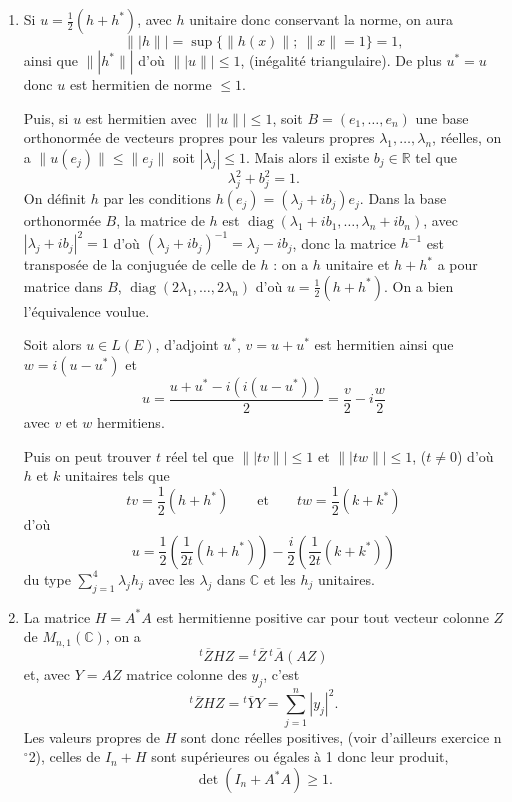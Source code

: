 \begin{enumerate}[label=\arabic*.,leftmargin=2.2em,itemsep=1.15em]
\item Si $u=\frac12(h+h^*)$, avec $h$ unitaire donc conservant la norme, on aura
\[
\|\!|h\|\!|=\sup\{\|h(x)\|;\ \|x\|=1\}=1,
\]
ainsi que $\|\!|h^*\|\!|$ d'où $\|\!|u\|\!|\le1$, (inégalité triangulaire). De plus $u^*=u$ donc $u$ est hermitien de norme $\le1$.

Puis, si $u$ est hermitien avec $\|\!|u\|\!|\le1$, soit $B=(e_1,\ldots,e_n)$ une base orthonormée de vecteurs propres pour les valeurs propres $\lambda_1,\ldots,\lambda_n$, réelles, on a $\|u(e_j)\|\le\|e_j\|$ soit $|\lambda_j|\le1$. Mais alors il existe $b_j\in\mathbb R$ tel que
\[
\lambda_j^2+b_j^2=1.
\]
On définit $h$ par les conditions $h(e_j)=(\lambda_j+ib_j)e_j$. Dans la base orthonormée $B$, la matrice de $h$ est $\operatorname{diag}(\lambda_1+ib_1,\ldots,\lambda_n+ib_n)$, avec $|\lambda_j+ib_j|^2=1$ d'où $(\lambda_j+ib_j)^{-1}=\lambda_j-ib_j$, donc la matrice $h^{-1}$ est transposée de la conjuguée de celle de $h$ : on a $h$ unitaire et $h+h^*$ a pour matrice dans $B$, $\operatorname{diag}(2\lambda_1,\ldots,2\lambda_n)$ d'où $u=\frac12(h+h^*)$. On a bien l'équivalence voulue.

Soit alors $u\in L(E)$, d'adjoint $u^*$, $v=u+u^*$ est hermitien ainsi que $w=i(u-u^*)$ et
\[
u=\frac{u+u^*-i(i(u-u^*))}{2}=\frac v2-i\frac w2
\]
avec $v$ et $w$ hermitiens.

Puis on peut trouver $t$ réel tel que $\|\!|tv\|\!|\le1$ et $\|\!|tw\|\!|\le1$, ($t\ne0$) d'où $h$ et $k$ unitaires tels que
\[
tv=\frac12(h+h^*)
\qquad\text{et}\qquad
tw=\frac12(k+k^*)
\]
d'où
\[
u=\frac12\left(\frac1{2t}(h+h^*)\right)-\frac i2\left(\frac1{2t}(k+k^*)\right)
\]
du type $\sum_{j=1}^4\lambda_jh_j$ avec les $\lambda_j$ dans $\mathbb C$ et les $h_j$ unitaires.

\item La matrice $H=A^*A$ est hermitienne positive car pour tout vecteur colonne $Z$ de $M_{n,1}(\mathbb C)$, on a
\[
{}^t\!\overline ZHZ={}^t\!\overline Z\,{}^t\!\overline A(AZ)
\]
et, avec $Y=AZ$ matrice colonne des $y_j$, c'est
\[
{}^t\!\overline ZHZ={}^t\!\overline YY=\sum_{j=1}^n|y_j|^2.
\]
Les valeurs propres de $H$ sont donc réelles positives, (voir d'ailleurs exercice n$^\circ$2), celles de $I_n+H$ sont supérieures ou égales à 1 donc leur produit,
\[
\det(I_n+A^*A)\ge1.
\]


\end{enumerate}
